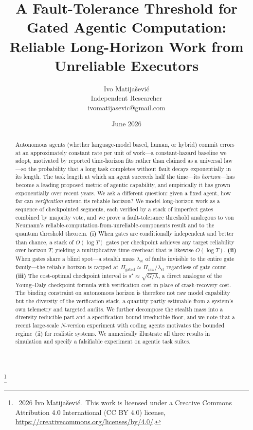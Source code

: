 \documentclass[11pt]{article}
\title{\vspace{-2em}A Fault-Tolerance Threshold for Gated Agentic Computation:\\
\large Reliable Long-Horizon Work from Unreliable Executors}
\author{Ivo Matijašević\\ \small Independent Researcher \\ \small ivomatijasevic@gmail.com}
\date{June 2026}
\theoremstyle{remark}
\newcommand{\lst}{\lambda_{\mathrm{st}}}
\newcommand{\Hraw}{H_{\mathrm{raw}}}
\newcommand{\Hgated}{H_{\mathrm{gated}}}
\newcommand\blfootnote[1]{\begingroup\renewcommand\thefootnote{}\footnote{#1}\addtocounter{footnote}{-1}\endgroup}
\begin{document}
\maketitle
\blfootnote{\textcopyright~2026 Ivo Matijašević.\ This work is licensed under a Creative Commons
Attribution 4.0 International (CC BY 4.0) license, \url{https://creativecommons.org/licenses/by/4.0/}.}

\begin{abstract}
Autonomous agents (whether language-model based, human, or hybrid) commit errors at an
approximately constant rate per unit of work---a constant-hazard baseline we adopt, motivated by
reported time-horizon fits rather than claimed as a universal law---so the probability that a long
task completes without fault decays exponentially in its length.
The task length at which an agent succeeds
half the time---its \emph{horizon}---has become a leading proposed metric of agentic capability, and
empirically it has grown exponentially over recent years.
We ask a different question: given a
fixed agent, how far can \emph{verification} extend its reliable horizon?
We model long-horizon
work as a sequence of checkpointed segments, each verified by a stack of imperfect gates combined
by majority vote, and we prove a fault-tolerance threshold analogous to von Neumann's
reliable-computation-from-unreliable-components result and to the quantum threshold theorem.
\textbf{(i)} When gates are conditionally independent and better than chance, a stack of
$O(\log T)$ gates per checkpoint achieves any target reliability over horizon $T$, yielding a
multiplicative time overhead that is likewise $O(\log T)$.
\textbf{(ii)} When gates share a blind spot---a stealth mass
$\lst$ of faults invisible to the entire gate family---the reliable horizon is capped at
$\Hgated \approx \Hraw/\lst$ regardless of gate count.
\textbf{(iii)} The cost-optimal checkpoint
interval is $s^\star \approx \sqrt{G/\lambda}$, a direct analogue of the Young--Daly checkpoint
formula with verification cost in place of crash-recovery cost.
The binding constraint on
autonomous horizon is therefore not raw model capability but the diversity of the verification
stack, a quantity partly estimable from a system's own telemetry and targeted audits.
We further decompose the stealth mass
into a diversity-reducible part and a specification-bound irreducible floor, and we note that a
recent large-scale $N$-version experiment with coding agents motivates the bounded regime~(ii) for
realistic systems.
We numerically illustrate all three results in simulation and specify a falsifiable
experiment on agentic task suites.
\end{abstract}
\end{document}
